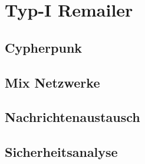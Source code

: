 \chapter{Typ-I Remailer}
\section{Cypherpunk}

\section{Mix Netzwerke}

\section{Nachrichtenaustausch}

\section{Sicherheitsanalyse}
